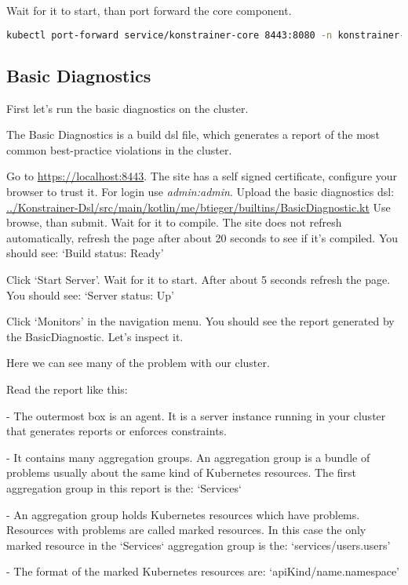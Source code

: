 Wait for it to start, than port forward the core component.

\begin{lstlisting}[caption={TODO},language=bash,label=code:bashx]
kubectl port-forward service/konstrainer-core 8443:8080 -n konstrainer-ns
\end{lstlisting}

\subsection{Basic Diagnostics}

First let's run the basic diagnostics on the cluster.

The Basic Diagnostics is a build dsl file, which generates a report of the most common best-practice violations in the cluster.

Go to \url{https://localhost:8443}. The site has a self signed certificate, configure your browser to trust it. For login use \emph{admin:admin}. Upload the basic diagnostics dsl: \url{../Konstrainer-Dsl/src/main/kotlin/me/btieger/builtins/BasicDiagnostic.kt} Use browse, than submit. Wait for it to compile. The site does not refresh automatically, refresh the page after about 20 seconds to see if it's compiled. You should see: `Build status: Ready'

Click `Start Server'. Wait for it to start. After about 5 seconds refresh the page. You should see: `Server status: Up'

Click `Monitors' in the navigation menu. You should see the report generated by the BasicDiagnostic. Let's inspect it.

Here we can see many of the problem with our cluster.

Read the report like this:

- The outermost box is an agent. It is a server instance running in your cluster that generates reports or enforces constraints.

- It contains many aggregation groups. An aggregation group is a bundle of problems usually about the same kind of Kubernetes resources. The first aggregation group in this report is the: `Services`

  - An aggregation group holds Kubernetes resources which have problems. Resources with problems are called marked resources. In this case the only marked resource in the `Services` aggregation group is the: `services/users.users'

  - The format of the marked Kubernetes resources are: `apiKind/name.namespace'


